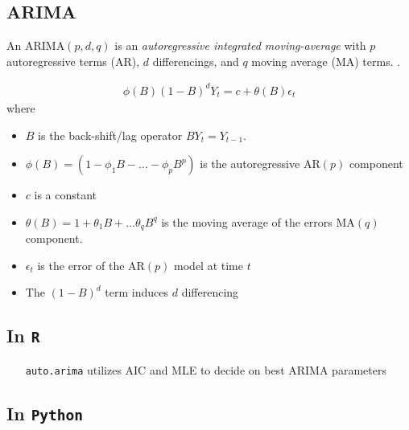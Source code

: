 \documentclass[12pt]{article}
\begin{document}
\subsection{ARIMA}

An $\text{ARIMA}(p,d,q)$ is an {\sl autoregressive integrated moving-average}
with $p$ autoregressive terms (AR), $d$ differencings, and $q$ moving average
(MA) terms. \cite{fpp}.

\begin{align*}
  \phi(B) (1-B)^d Y_t = c + \theta(B) \epsilon_t
\end{align*}
where
\begin{itemize}
\item $B$ is the back-shift/lag operator $BY_t = Y_{t-1}$.
\item $\phi(B) = (1 - \phi_1 B - \ldots - \phi_p B^p )$ is the autoregressive
  $\text{AR}(p)$ component
\item $c$ is a constant
\item $\theta(B) =  1 + \theta_1 B + \ldots \theta_q B^q$ is the moving
    average of the errors $\text{MA}(q)$ component.
\item $\epsilon_t$ is the error of the $\text{AR}(p)$ model at time $t$
\item The $(1-B)^d$ term induces $d$ differencing
\end{itemize}




\subsection{In {\tt R}}

\begin{itemize}
\item[{\tt auto.arima}] utilizes AIC and MLE to decide on best ARIMA parameters
\end{itemize}

\subsection{In {\tt Python}}

\printbibliography[title={References (Time Series \& Forecasting)},heading=subbibnumbered]
\pagebreak


\end{document}
